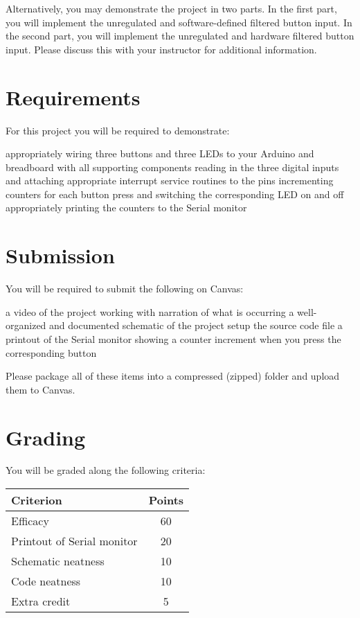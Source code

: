 Alternatively, you may demonstrate the project in two parts. In the first part, you will implement the unregulated and software-defined filtered button input.
In the second part, you will implement the unregulated and hardware filtered button input.
Please discuss this with your instructor for additional information.

\section*{Requirements}
For this project you will be required to demonstrate:

\begin{outline}
    \1 appropriately wiring three buttons and three LEDs to your Arduino and breadboard with all supporting components
    \1 reading in the three digital inputs and attaching appropriate interrupt service routines to the pins
    \1 incrementing counters for each button press and switching the corresponding LED on and off
    \1 appropriately printing the counters to the Serial monitor
\end{outline}

\section*{Submission}
You will be required to submit the following on Canvas:
\begin{outline}
    \1 a video of the project working with narration of what is occurring
    \1 a well-organized and documented schematic of the project setup
    \1 the source code file
    \1 a printout of the Serial monitor showing a counter increment when you press the corresponding button
\end{outline}
Please package all of these items into a compressed (zipped) folder and upload them to Canvas.

\section*{Grading}
You will be graded along the following criteria:

\begin{table*}[ht!]
    \begin{tabular}{ l | c }
        \toprule
        Criterion & Points \\

        \midrule
        Efficacy & 60 \\
        Printout of Serial monitor & 20 \\
        Schematic neatness & 10 \\
        Code neatness & 10 \\
        Extra credit & 5 \\

        \bottomrule
    \end{tabular}
\end{table*}

